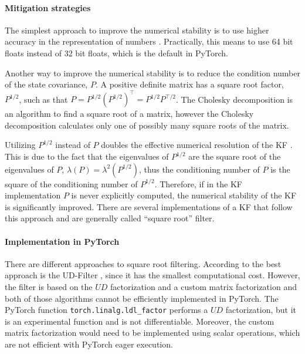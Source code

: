 \documentclass{article}
\begin{document}
\paragraph{Mitigation strategies}
The simplest approach to improve the numerical stability is to use higher accuracy in the representation of numbers \cite{dan_simon_optimal_2006}. Practically, this means to use 64 bit floats instead of 32 bit floats, which is the default in \textsf{PyTorch}.

Another way to improve the numerical stability is to reduce the condition number of the state covariance, $P$. A positive definite matrix has a square root factor, $P^{1/2}$, such as that $P = P^{1/2}(P^{1/2})^\top=P^{1/2}P^{\top/2}$.
The Cholesky decomposition is an algorithm to find a square root of a matrix, however the Cholesky decomposition calculates only one of possibly many square roots of the matrix.

Utilizing $P^{1/2}$ instead of $P$ doubles the effective numerical resolution of the KF \cite{kaminski_discrete_1971,dan_simon_optimal_2006,rutten_square-root_2013}. This is due to the fact that the eigenvalues of $P^{1/2}$ are the square root of the eigenvalues of $P$, $\lambda(P) = \lambda^2(P^{1/2})$, thus the conditioning number of $P$ is the square of the conditioning number of $P^{1/2}$. Therefore, if in the KF implementation $P$ is never explicitly computed, the numerical stability of the KF is significantly improved.
There are several implementations of a KF that follow this approach \cite{potter_statistical_1963,carlson_fast_1973,bierman_numerical_1977} and are generally called ``square root'' filter.


\paragraph{Implementation in PyTorch}
There are different approaches to square root filtering. According to \textcite{mohinder_s_grewal_kalman_2001} the best approach is the UD-Filter \cite{bierman_numerical_1977}, since it has the smallest computational cost. However, the filter is based on the $UD$ factorization and a custom matrix factorization \cite{mohinder_s_grewal_kalman_2001} and both of those algorithms cannot be efficiently implemented in \textsf{PyTorch}. The \textsf{PyTorch} function \verb|torch.linalg.ldl_factor| performs a $UD$ factorization, but it is an experimental function and is not differentiable. Moreover, the custom matrix factorization would need to be implemented using scalar operations, which are not efficient with \textsf{PyTorch} eager execution.
\end{document}
